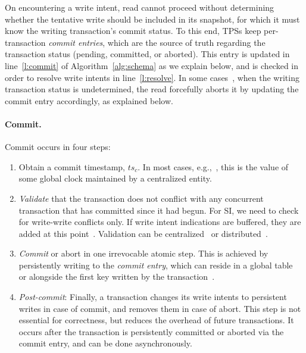 On encountering a write intent, read cannot proceed without determining whether the tentative write should be included in its snapshot,
for which it must know the writing transaction's commit status. 
To this end, TPSs keep per-transaction \emph{commit entries}, which are the source of truth regarding the transaction status 
(pending, committed, or aborted). 
This entry is updated in line~\ref{l:commit} of Algorithm~\ref{alg:schema} as we explain below, 
and is checked in order to resolve write intents in line~\ref{l:resolve}.
In some cases~\cite{Percolator2010,cockroach}, when the writing transaction status is undetermined, the read forcefully aborts
it by updating the commit entry accordingly, as explained below.


  \paragraph{Commit.} 
  Commit occurs in four steps:
  \begin{enumerate}

  \item
  Obtain a commit timestamp, $ts_c$. 
  In most cases, e.g.,~\cite{Percolator2010,OmidICDE2014,Omid2017,tephra}, 
  this is the value of some global clock maintained by a centralized entity. 
  \item \emph{Validate} that the transaction does not conflict with any concurrent transaction that has committed since it 
had begun.  For SI, we need to check for write-write conflicts only. 
If write intent indications are buffered, they are added at this point~\cite{Percolator2010}.
Validation can be centralized~\cite{OmidICDE2014,Omid2017,tephra} or distributed~\cite{Percolator2010,cockroach}. 


\item \emph{Commit} or abort in one  irrevocable atomic step. This is achieved by persistently writing to the \emph{commit entry}, 
  which can reside in a global table~\cite{Omid2017,cockroach} or alongside the first  key written by 
  the transaction~\cite{Percolator2010}.  
  
 \item \emph{Post-commit}: 
  Finally, a transaction changes its write intents to
  persistent writes in case of commit, and removes them in case of abort. This
  step is not essential for correctness, but reduces the overhead of future transactions. It
  occurs after the transaction is persistently committed or aborted via the commit entry, 
  and can be done asynchronously.
 \end{enumerate}
 
